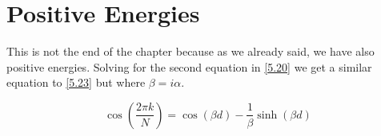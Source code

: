 \section{Positive Energies}

This is not the end of the chapter because as we already said, we have also positive energies. Solving for the second equation in \ref{5.20} we get a similar equation to \ref{5.23} but where $\beta = i\alpha$.

\begin{equation}
  \label{5.26}
  \cos{\left(\frac{2\pi k}{N}\right)} = \cos{(\beta d)} - \frac{1}{\beta} \sinh{(\beta d)}
\end{equation}









